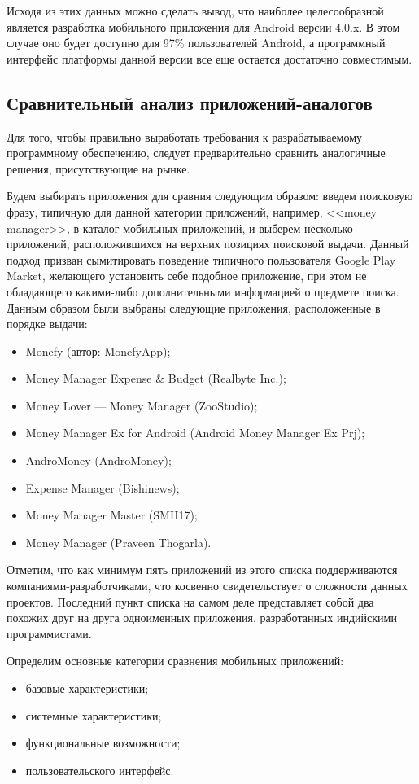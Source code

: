 Исходя из этих данных можно сделать вывод, что наиболее целесообразной
является разработка мобильного приложения для Android версии 4.0.x.
В этом случае оно будет доступно для 97\% пользователей Android,
а программный интерфейс платформы данной версии все еще остается
достаточно совместимым.


\subsection{Сравнительный анализ приложений-аналогов}
\label{subsec:system_spec_compare}

Для того, чтобы правильно выработать требования к разрабатываемому
программному обеспечению, следует предварительно сравнить
аналогичные решения, присутствующие на рынке.

Будем выбирать приложения для сравния следующим образом:
введем поисковую фразу, типичную для данной категории приложений,
например, <<money manager>>, в каталог мобильных приложений,
и выберем несколько приложений, расположившихся на верхних позициях
поисковой выдачи.
Данный подход призван сымитировать поведение типичного пользователя
Google Play Market, желающего установить себе подобное приложение,
при этом не обладающего какими-либо дополнительными информацией
о предмете поиска. Данным образом были выбраны следующие приложения,
расположенные в порядке выдачи:
\begin{itemize}
\item Monefy (автор: MonefyApp);
\item Money Manager Expense \& Budget (Realbyte Inc.);
\item Money Lover --- Money Manager (ZooStudio);
\item Money Manager Ex for Android (Android Money Manager Ex Prj);
\item AndroMoney (AndroMoney);
\item Expense Manager (Bishinews);
\item Money Manager Master (SMH17);
\item Money Manager (Praveen Thogarla).
\end{itemize}

Отметим, что как минимум пять приложений из этого списка поддерживаются
компаниями-разработчиками, что косвенно свидетельствует о сложности данных проектов.
Последний пункт списка на самом деле представляет собой два похожих друг
на друга одноименных приложения, разработанных индийскими программистами.

Определим основные категории сравнения мобильных приложений:
\begin{itemize}
\item базовые характеристики;
\item системные характеристики;
\item функциональные возможности;
\item пользовательского интерфейс.
\end{itemize}

